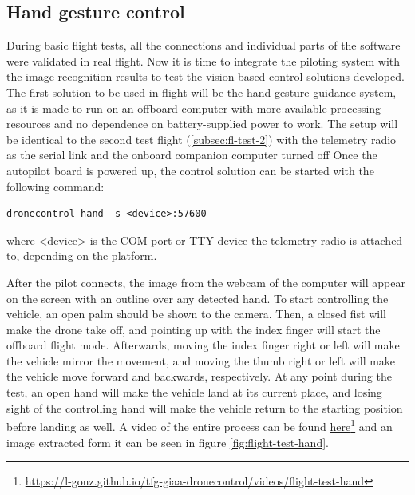 \subsection{Hand gesture control}
\label{subsec:fl-test-4}


During basic flight tests, all the connections and individual parts of the software were validated in real flight.
Now it is time to integrate the piloting system with the image recognition results to test the vision-based control solutions developed.
The first solution to be used in flight will be the hand-gesture guidance system, as it is made to run on an offboard computer with more available processing resources and no dependence on battery-supplied power to work.
The setup will be identical to the second test flight (\ref{subsec:fl-test-2}) with the telemetry radio as the serial link and the onboard companion computer turned off
Once the autopilot board is powered up, the control solution can be started with the following command:
\begin{verbatim}
dronecontrol hand -s <device>:57600
\end{verbatim}
where <device> is the COM port or TTY device the telemetry radio is attached to, depending on the platform.


After the pilot connects, the image from the webcam of the computer will appear on the screen with an outline over any detected hand.
To start controlling the vehicle, an open palm should be shown to the camera.
Then, a closed fist will make the drone take off, and pointing up with the index finger will start the offboard flight mode.
Afterwards, moving the index finger right or left will make the vehicle mirror the movement, 
and moving the thumb right or left will make the vehicle move forward and backwards, respectively.
At any point during the test, an open hand will make the vehicle land at its current place, and losing sight of the controlling hand will make the vehicle return to the starting position before landing as well.
A video of the entire process can be found \href{https://l-gonz.github.io/tfg-giaa-dronecontrol/videos/flight-test-hand}{here}\footnote{\url{https://l-gonz.github.io/tfg-giaa-dronecontrol/videos/flight-test-hand}} and an image extracted form it can be seen in figure \ref{fig:flight-test-hand}.

